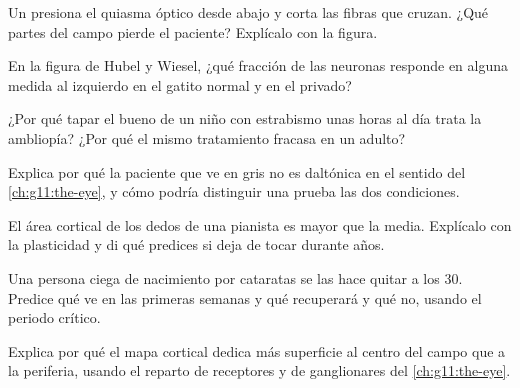 \begin{exercise}[$\star\star$]\label{exo:g11:vision-and-brain:7}
Un  presiona el quiasma óptico desde abajo y corta las fibras que
cruzan. ¿Qué partes del campo pierde el paciente? Explícalo con la
figura.
\end{exercise}

\begin{exercise}[$\star\star$]\label{exo:g11:vision-and-brain:8}
En la figura de Hubel y Wiesel, ¿qué fracción de las neuronas responde
en alguna medida al  izquierdo en el gatito normal y en el privado?
\end{exercise}

\begin{exercise}[$\star\star$]\label{exo:g11:vision-and-brain:9}
¿Por qué tapar el  bueno de un niño con estrabismo unas horas al día
trata la ambliopía? ¿Por qué el mismo tratamiento fracasa en un adulto?
\end{exercise}

\begin{exercise}[$\star\star$]\label{exo:g11:vision-and-brain:10}
Explica por qué la paciente que ve en gris no es daltónica en el
sentido del \cref{ch:g11:the-eye}, y cómo podría distinguir una prueba
las dos condiciones.
\end{exercise}

\begin{exercise}[$\star\star$]\label{exo:g11:vision-and-brain:11}
El área cortical de los dedos de una pianista es mayor que la media.
Explícalo con la plasticidad y di qué predices si deja de tocar durante
años.
\end{exercise}

\begin{exercise}[$\star\star\star$]\label{exo:g11:vision-and-brain:12}
Una persona ciega de nacimiento por cataratas se las hace quitar a los
30. Predice qué ve en las primeras semanas y qué recuperará y qué no,
usando el periodo crítico.
\end{exercise}

\begin{exercise}[$\star\star\star$]\label{exo:g11:vision-and-brain:13}
Explica por qué el mapa cortical dedica más superficie al centro del
campo que a la periferia, usando el reparto de receptores y de 
ganglionares del \cref{ch:g11:the-eye}.
\end{exercise}

